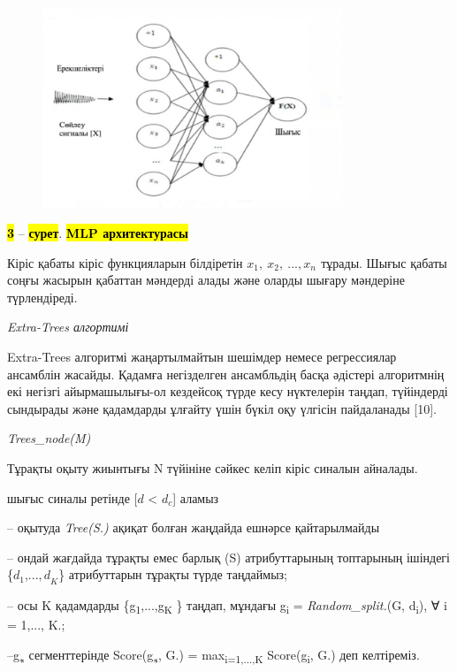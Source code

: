\begin{figure}[H]
	\centering
	\includegraphics[width=0.8\textwidth]{media/ict/image7}
	\caption*{}
\end{figure}


{\bfseries \hl{3}} -- {\bfseries \hl{сурет}}. {\bfseries \hl{MLP архитектурасы}}

Кіріс қабаты кіріс функцияларын білдіретін
\hl{}\(x_{1},\ x_{2},\ ...,x_{n\ }\ \)тұрады. Шығыс қабаты соңғы жасырын
қабаттан мәндерді алады және оларды шығару мәндеріне түрлендіреді.

\emph{Extra-Trees алгортимі}

Extra-Trees алгоритмі жаңартылмайтын шешімдер немесе регрессиялар
ансамблін жасайды. Қадамға негізделген ансамбльдің басқа әдістері
алгоритмнің екі негізгі айырмашылығы-ол кездейсоқ түрде кесу нүктелерін
таңдап, түйіндерді сындырады және қадамдарды ұлғайту үшін бүкіл оқу
үлгісін пайдаланады {[}10{]}.

\emph{Trees\_node(M)}

Тұрақты оқыту жиынтығы N түйініне сәйкес келіп кіріс синалын айналады.

шығыс синалы ретінде {[}\(d\) \textless{} \(d_{c}\){]} аламыз

-- оқытуда \emph{Tree(S.)} ақиқат болған жаңдайда ешнәрсе қайтарылмайды

-- ондай жағдайда тұрақты емес барлық (S) атрибуттарының топтарының
ішіндегі \{\(d_{1}\),...\({,d}_{K}\)\} атрибуттарын тұрақты түрде
таңдаймыз;

-- осы K қадамдарды \{g\textsubscript{1},...,g\textsubscript{K} \}
таңдап, мұндағы g\textsubscript{i} = \emph{Random\_split.}(G,
d\textsubscript{i}), ∀ i = 1,..., K.;

--g\textsubscript{∗} сегменттерінде Score(g\textsubscript{∗}, G.) =
max\textsubscript{i=1,...,K} Score(g\textsubscript{i}, G.) деп
келтіреміз.

